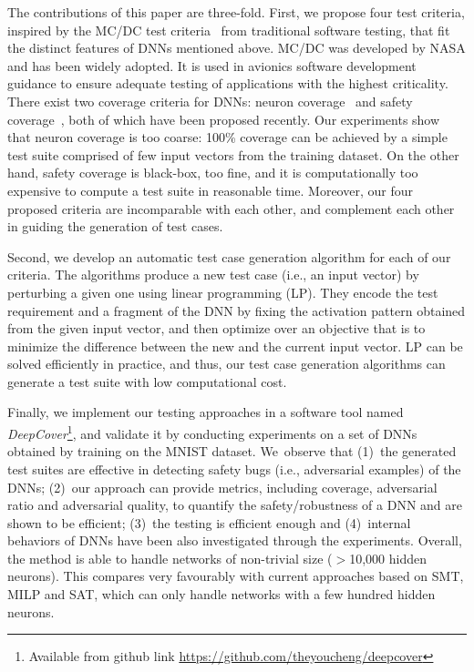 \documentclass[runningheads,a4paper]{llncs}
\begin{document}
The contributions of this paper are three-fold. 
First, we propose four test criteria, inspired by the MC/DC test
criteria~\cite{HVCR2001} from traditional software testing, that fit the
distinct features of DNNs mentioned above. MC/DC was developed by NASA and 
has been widely adopted. It is used in avionics software development guidance to 
ensure adequate testing of applications with the highest criticality.
There exist two coverage criteria for DNNs: neuron coverage~\cite{PCYJ2017} and
safety coverage~\cite{WHK2018}, both of which have been proposed recently.  Our
experiments show that neuron coverage is too coarse: 100\% coverage can be
achieved by a simple test suite comprised of few input vectors from the training dataset.  On
the other hand, safety coverage is black-box, too fine, and it is
computationally too expensive to compute a test suite in reasonable time.
Moreover, our four proposed criteria are incomparable with each other, and
complement each other in guiding the generation of test cases.

Second, we develop an automatic test case generation algorithm for each of
our criteria.  The algorithms produce a new test case (i.e., an input
vector) by perturbing a given one using linear programming (LP).  They
encode the test requirement and a fragment of the DNN by fixing the
activation pattern obtained from the given input vector, and then optimize
over an objective that is to minimize the difference between the new and the
current input vector.  LP can be solved efficiently in practice, and thus,
our test case generation algorithms can generate a test suite with
low computational cost.

Finally, we implement our testing approaches in a software tool named
\emph{DeepCover}\footnote{Available from github link \url{https://github.com/theyoucheng/deepcover}},
and validate it by conducting
experiments on a set of DNNs obtained by training on the MNIST dataset. 
We~observe that (1)~the generated test suites are effective in detecting
safety bugs (i.e., adversarial examples) of the DNNs; (2)~our approach can
provide metrics, including coverage, adversarial ratio and adversarial
quality, to quantify the safety/robustness of a DNN and are shown to be
efficient; (3)~the testing is efficient enough and (4)~internal behaviors of
DNNs have been also investigated through the experiments.  Overall, the
method is able to handle networks of non-trivial size ($>$10,000 hidden
neurons).  This compares very favourably with current approaches based on
SMT, MILP and SAT, which can only handle networks with a few hundred hidden
neurons.
\end{document}
